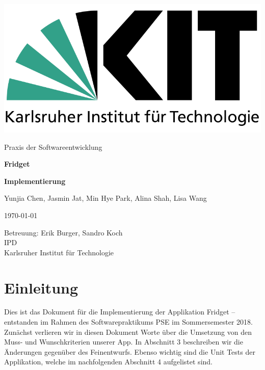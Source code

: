 \documentclass[a4paper]{scrreprt}
\begin{document}
	
	\begin{flushright}
		\includegraphics[scale = 0.2]{kit-logo.png}\\[0.5cm]
	\end{flushright}
	\vspace*{2cm}
	
	\begin{center}
		\large Praxis der Softwareentwicklung
		\vspace*{1.5cm}
		
		\textbf{\huge Fridget}
		\vspace*{1cm}
		
		\textbf{\Large Implementierung}
		\vspace*{2cm}
		
		Yunjia Chen, Jasmin Jat, Min Hye Park, Alina Shah, Lisa Wang
		\vspace*{1cm}
		
		\today
		\vspace*{2.5cm}
		
		Betreuung: Erik Burger, Sandro Koch\\[0.5cm]
		IPD\\[0.5cm]
		
		Karlsruher Institut für Technologie
		
	\end{center}

	\thispagestyle{empty}
	
	\tableofcontents
	
	\chapter{Einleitung}
	Dies ist das Dokument für die Implementierung der Applikation Fridget – entstanden im Rahmen
	des Softwarepraktikums PSE im Sommersemester 2018.
	Zunächst verlieren wir in diesen Dokument Worte über die Umsetzung von den Muss- und Wunschkriterien unserer App.
	In Abschnitt 3 beschreiben wir die Änderungen gegenüber des Feinentwurfs.
	Ebenso wichtig sind die Unit Tests der Applikation, welche im nachfolgenden Abschnitt 4 aufgelistet sind.
	
\end{document}
